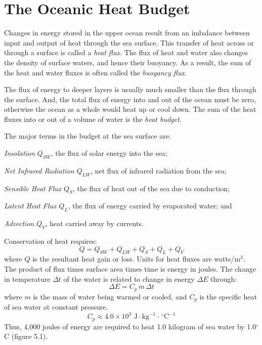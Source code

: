 \section{The Oceanic Heat Budget}
Changes in energy stored in the upper ocean
result from an imbalance between input and output of heat through the
sea surface. This transfer of heat across or through a surface is
called a \textit{heat flux}. The flux of heat
and water also changes the density of surface waters, and hence their
buoyancy. As a result, the sum of the heat and water fluxes is often
called the \textit{buoyancy flux}.

The flux of energy to deeper layers is usually much smaller than the
flux through the surface. And, the total flux of energy into and out
of the ocean must be zero, otherwise the ocean as a whole would heat
up or cool down. The sum of the heat fluxes into or out of a volume of
water is the \textit{heat budget}.

The major terms in the budget at the sea surface are:
\begin{enumerate}
\vitem \textit{Insolation} $Q_{SW}$, the flux
of solar energy into the sea;

\vitem \textit{Net Infrared Radiation} $Q_{LW}$, net flux of infrared radiation from the sea;

\vitem \textit{Sensible Heat Flux} $Q_S$, the flux of heat out of the sea due to conduction;

\vitem \textit{Latent Heat Flux} $Q_L$, the flux of energy carried by evaporated water; and

\vitem \textit{Advection} $Q_V$, heat carried
away by currents.
\end{enumerate}

Conservation of heat requires:
\begin{equation}Q = Q_{SW} + Q_{LW} + Q_S + Q_L + Q_V \end{equation}
where $Q$ is the resultant heat gain or loss. Units for heat
fluxes are watts/m$^2$. The product of flux
times surface area times time is energy in joules. The change in
temperature $\Delta t$ of the water is related to change in energy
$\Delta E$ through:
\begin{equation}
\Delta E = C_{p} \, m \, \Delta t
\end{equation}
where $m$ is the mass of water being warmed or cooled, and $C_p$ is
the specific heat of sea water at constant pressure.
\begin{equation}
C_{p} \approx 4.0\times 10^{3} \mbox{ J}\cdot \mbox{kg}^{-1} \cdot \, ^\circ
\mbox{C}^{-1}
\end{equation}
Thus, 4,000 joules of energy are required to heat 1.0 kilogram of sea
water by 1.0$^{\circ}$C (figure 5.1).

